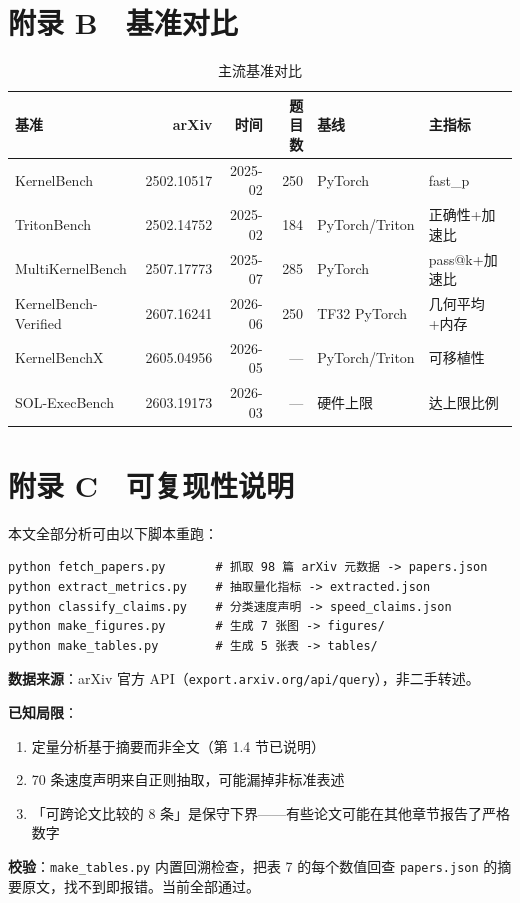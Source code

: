 \section{附录 B　基准对比}

\begin{table}[t]
\centering
\footnotesize
\setlength{\tabcolsep}{4pt}
\caption{主流基准对比}
\label{tab:13}
\begin{tabular}{lrrrll}
\toprule
基准 & arXiv & 时间 & 题目数 & 基线 & 主指标 \\
\midrule
KernelBench & 2502.10517 & 2025-02 & 250 & PyTorch & fast\_p \\
TritonBench & 2502.14752 & 2025-02 & 184 & PyTorch/Triton & 正确性+加速比 \\
MultiKernelBench & 2507.17773 & 2025-07 & 285 & PyTorch & pass@k+加速比 \\
KernelBench-Verified & 2607.16241 & 2026-06 & 250 & TF32 PyTorch & 几何平均+内存 \\
KernelBenchX & 2605.04956 & 2026-05 & — & PyTorch/Triton & 可移植性 \\
SOL-ExecBench & 2603.19173 & 2026-03 & — & 硬件上限 & 达上限比例 \\
\bottomrule
\end{tabular}
\end{table}



\section{附录 C　可复现性说明}

本文全部分析可由以下脚本重跑：


\begin{lstlisting}
python fetch_papers.py       # 抓取 98 篇 arXiv 元数据 -> papers.json
python extract_metrics.py    # 抽取量化指标 -> extracted.json
python classify_claims.py    # 分类速度声明 -> speed_claims.json
python make_figures.py       # 生成 7 张图 -> figures/
python make_tables.py        # 生成 5 张表 -> tables/
\end{lstlisting}

\textbf{数据来源}：arXiv 官方 API（\texttt{export.arxiv.org/api/query}），非二手转述。


\textbf{已知局限}：


\begin{enumerate}
  \item 定量分析基于摘要而非全文（第 1.4 节已说明）
  \item 70 条速度声明来自正则抽取，可能漏掉非标准表述
  \item 「可跨论文比较的 8 条」是保守下界——有些论文可能在其他章节报告了严格数字
\end{enumerate}

\textbf{校验}：\texttt{make\_tables.py} 内置回溯检查，把表 7 的每个数值回查 \texttt{papers.json} 的摘要原文，找不到即报错。当前全部通过。

